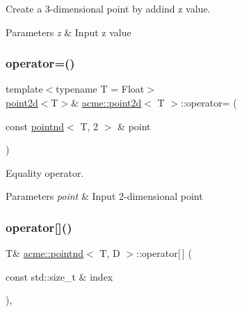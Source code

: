 Create a 3-\/dimensional point by addind z value. 


\begin{DoxyParams}{Parameters}
{\em z} & Input z value \\
\hline
\end{DoxyParams}
\mbox{\label{classacme_1_1point2d_a1032b0e98d229f2d6d59aba5514b3c2f}} 
\subsubsection{\texorpdfstring{operator=()}{operator=()}}
{\footnotesize\ttfamily template$<$typename T = Float$>$ \\
\hyperlink{classacme_1_1point2d}{point2d}$<$T$>$\& \hyperlink{classacme_1_1point2d}{acme\+::point2d}$<$ T $>$\+::operator= (\begin{DoxyParamCaption}\item[{const \hyperlink{classacme_1_1pointnd}{pointnd}$<$ T, 2 $>$ \&}]{point }\end{DoxyParamCaption})\hspace{0.3cm}{\ttfamily [inline]}}



Equality operator. 


\begin{DoxyParams}{Parameters}
{\em point} & Input 2-\/dimensional point \\
\hline
\end{DoxyParams}
\mbox{\label{classacme_1_1pointnd_a35b0691673728d98d455c007612d6b91}} 
\subsubsection{\texorpdfstring{operator[]()}{operator[]()}\hspace{0.1cm}{\footnotesize\ttfamily [1/2]}}
{\footnotesize\ttfamily T\& \hyperlink{classacme_1_1pointnd}{acme\+::pointnd}$<$ T, D $>$\+::operator\mbox{[}$\,$\mbox{]} (\begin{DoxyParamCaption}\item[{const std\+::size\+\_\+t \&}]{index }\end{DoxyParamCaption})\hspace{0.3cm}{\ttfamily [inline]}, {\ttfamily [inherited]}}



